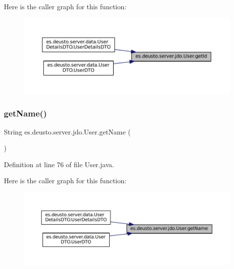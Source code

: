 Here is the caller graph for this function\+:
\nopagebreak
\begin{figure}[H]
\begin{center}
\leavevmode
\includegraphics[width=350pt]{classes_1_1deusto_1_1server_1_1jdo_1_1_user_ac116b1ec523da06c6776eaa76c910125_icgraph}
\end{center}
\end{figure}
\mbox{\label{classes_1_1deusto_1_1server_1_1jdo_1_1_user_ae241c2d5fbef940165041c82dc00edad}} 
\subsubsection{\texorpdfstring{getName()}{getName()}}
{\footnotesize\ttfamily String es.\+deusto.\+server.\+jdo.\+User.\+get\+Name (\begin{DoxyParamCaption}{ }\end{DoxyParamCaption})}



Definition at line 76 of file User.\+java.

Here is the caller graph for this function\+:
\nopagebreak
\begin{figure}[H]
\begin{center}
\leavevmode
\includegraphics[width=350pt]{classes_1_1deusto_1_1server_1_1jdo_1_1_user_ae241c2d5fbef940165041c82dc00edad_icgraph}
\end{center}
\end{figure}
\mbox{\label{classes_1_1deusto_1_1server_1_1jdo_1_1_user_a1900ee126da22ed0f043e0077e8be049}} 
